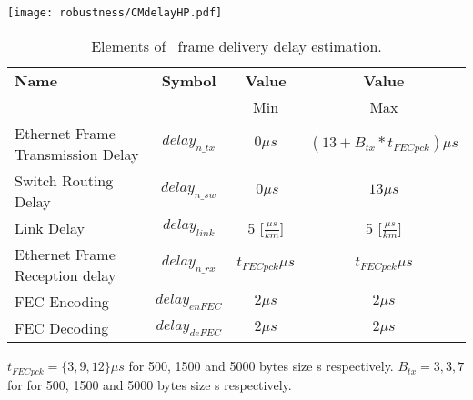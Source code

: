 \begin{center}
	\texttt{[image: robustness/CMdelayHP.pdf]}
	\label{fig:CMdelayHP}
\end{center}

\begin{table}[ht]
\caption{Elements of \ControlMessage\ frame delivery delay estimation.} 
\centering
	\begin{tabular}{| l |  c | c | c |}          \hline
\textbf{Name}&\textbf{Symbol}&\textbf{Value}&\textbf{Value}                  \\
                                 &                &  Min& Max          \\ \hline
Ethernet Frame Transmission Delay&$delay_{n\_tx}$&$0\mu s$&$(13 + B_{tx}
*t_{FECpck})
\mu s$
\\ \hline
Switch Routing Delay            &$delay_{n\_sw}$&$~0\mu s$&$13\mu s$ 
 
\\ \hline
Link Delay                       & $delay_{link}$ &5 [$\frac{\mu
s}{km}$]&5 [$\frac{\mu s}{km}$]      
\\ \hline
Ethernet Frame Reception delay   & $delay_{n\_rx}$&$t_{FECpck}\mu
s$&$t_{FECpck}\mu s$
\\ \hline
FEC Encoding                     & $delay_{enFEC}$&$2\mu s$&$2\mu s$
\\ \hline
FEC Decoding                     & $delay_{deFEC}$&$2\mu s$&$2\mu s$
\\ \hline

\end{tabular}
\label{tab:CMdelayHP}
\end{table}

$t_{FECpck} = \{3,9,12\} \mu s$ for 500, 1500 and 5000 bytes size
\ControlMessage s respectively.
$B_{tx} = {3,3,7}$ for for 500, 1500 and 5000 bytes size \ControlMessage s
respectively.
 

